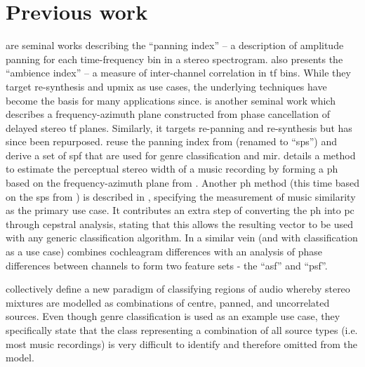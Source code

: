 \documentclass[twoside,a4paper]{article}
\begin{document}
\section{Previous work}
\label{sec:previouswork}

\cite{avendano2002frequency,avendanoFrequencydomainSourceIdentification2003} are seminal works describing the \enquote{panning index} -- a description of amplitude panning for each time-frequency bin in a stereo spectrogram. \cite{avendano2002frequency} also presents the \enquote{ambience index} -- a measure of inter-channel correlation in \gls{tf} bins. While they target re-synthesis and upmix as use cases, the underlying techniques have become the basis for many applications since. 
\cite{barrySoundSourceSeparation2004} is another seminal work which describes a frequency-azimuth plane constructed from phase cancellation of delayed stereo \gls{tf} planes. Similarly, it targets re-panning and re-synthesis but has since been repurposed.
\cite{tzanetakisStereoPanningFeatures2007,tzanetakisStereoPanningInformation2010} reuse the panning index from \cite{avendano2002frequency} (renamed to \enquote{\gls{sps}}) and derive a set of \gls{spf} that are used for genre classification and \gls{mir}.
\cite{sarroffMeasurementsSpaciousnessStereophonic2008} details a method to estimate the perceptual stereo width of a music recording by forming a \gls{ph} based on the frequency-azimuth plane from \cite{barrySoundSourceSeparation2004}.
Another \gls{ph} method (this time based on the \gls{sps} from \cite{tzanetakisStereoPanningFeatures2007}) is described in \cite{gomezMusicSimilaritySystems2008,guausAudioContentProcessing2009}, specifying the measurement of music similarity as the primary use case. It contributes an extra step of converting the \gls{ph} into \gls{pc} through cepstral analysis, stating that this allows the resulting vector to be used with any generic classification algorithm.
In a similar vein (and with classification as a use case) \cite{tardieuProductionEffectAudio2011} combines cochleagram differences with an analysis of phase differences between channels to form two feature sets - the \enquote{\gls{asf}} and \enquote{\gls{psf}}.

\cite{harmaClassificationTimefrequencyRegions2010,harmaClassificationTimefrequencyRegions2011,harmaStereoAudioClassification2011} collectively define a new paradigm of classifying regions of audio whereby stereo mixtures are modelled as combinations of centre, panned, and uncorrelated sources. Even though genre classification is used as an example use case, they specifically state that the class representing a combination of all source types (i.e. most music recordings) is very difficult to identify and therefore omitted from the model.
\end{document}
